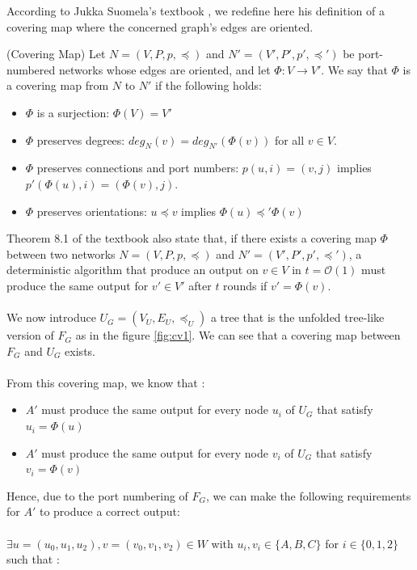 According to Jukka Suomela's textbook \cite{textbook}, we redefine here his definition of a covering map where the concerned graph's edges are oriented.
\begin{defi}
(Covering Map) Let $N = (V,P,p, \preceq)$ and $N' = (V',P',p',\preceq')$ be port-numbered networks whose edges are oriented, and let $\Phi: V \rightarrow V'$. We say that $\Phi$ is a covering map from $N$ to $N'$ if the following holds:
\begin{itemize}
    \item $\Phi$ is a surjection: $\Phi(V) = V'$
    \item $\Phi$ preserves degrees: $deg_N(v) = deg_{N'}(\Phi(v))$ for all $v \in V$.
    \item $\Phi$ preserves connections and port numbers: $p(u,i) = (v,j)$ implies
    $p'(\Phi(u), i) = (\Phi(v), j)$.
    \item $\Phi$ preserves orientations: $u \preceq v$ implies  $\Phi(u) \preceq' \Phi(v)$
\end{itemize}
\end{defi}
Theorem 8.1 of the textbook \cite[p.127]{textbook} also state that, if there exists a covering map $\Phi$ between two networks $N = (V,P,p, \preceq)$ and $N' = (V',P',p',\preceq')$, a deterministic algorithm that produce an output on $v \in V$ in $t=\mathcal{O}(1)$ must produce the same output for $v'\in V'$ after $t$ rounds if $v' = \Phi(v)$.\\\\
We now introduce $U_G = (V_U, E_U,\preceq_U)$ a tree that is the unfolded tree-like version of $F_G$ \cite[p. 7]{linear_in_delta} as in the figure \ref{fig:cv1}. We can see that a covering map between $F_G$ and $U_G$ exists.\\\\
 From this covering map, we know that :
 \begin{itemize}
     \item $A'$ must produce the same output for every node $u_i$ of $U_G$ that satisfy $u_i = \Phi(u)$
     \item $A'$ must produce the same output for every node $v_i$ of $U_G$ that satisfy $v_i = \Phi(v)$
 \end{itemize}
Hence, due to the port numbering of $F_G$, we can make the following requirements for $A'$ to produce a correct output:\\\\
$\exists u = (u_0,u_1,u_2),v = (v_0,v_1,v_2) \in W $ with $u_i,v_i\in \{A,B,C\}$ for $i\in \{0,1,2\}$ such that :
